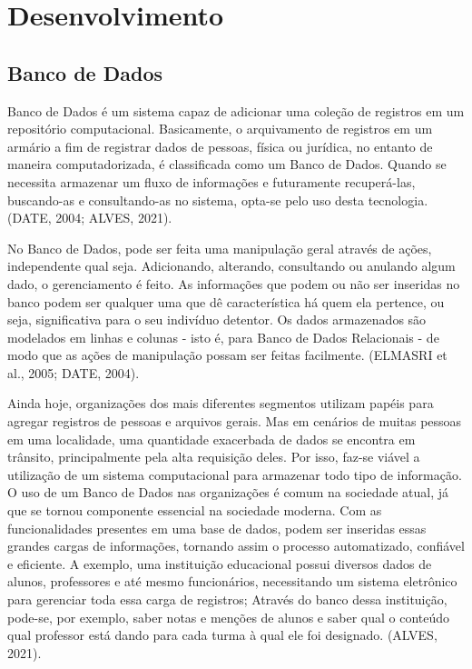 \documentclass[a4paper,12pt]{article}
\begin{document}
\pagebreak
\section{Desenvolvimento}
\subsection{Banco de Dados}
Banco de Dados é um sistema capaz de adicionar uma coleção de registros em um repositório computacional. Basicamente, o arquivamento de 
registros em um armário a fim de registrar dados de pessoas, física ou jurídica, no entanto de maneira computadorizada, é classificada 
como um Banco de Dados. Quando se necessita armazenar um fluxo de informações e futuramente recuperá-las, buscando-as e consultando-as 
no sistema, opta-se pelo uso desta tecnologia. (DATE, 2004; ALVES, 2021).

No Banco de Dados, pode ser feita uma manipulação geral através de ações, independente qual seja. Adicionando, alterando, consultando 
ou anulando algum dado, o gerenciamento é feito. As informações que podem ou não ser inseridas no banco podem ser qualquer uma que 
dê característica há quem ela pertence, ou seja, significativa para o seu indivíduo detentor. Os dados armazenados são modelados em 
linhas e colunas - isto é, para Banco de Dados Relacionais - de modo que as ações de manipulação possam ser feitas facilmente. (ELMASRI et al., 2005; DATE, 2004).

Ainda hoje, organizações dos mais diferentes segmentos utilizam papéis para agregar registros de pessoas e arquivos gerais. Mas em cenários
de muitas pessoas em uma localidade, uma quantidade exacerbada de dados se encontra em trânsito, principalmente pela alta requisição deles. 
Por isso, faz-se viável a utilização de um sistema computacional para armazenar todo tipo de informação. O uso de um Banco de Dados nas 
organizações é comum na sociedade atual, já que se tornou componente essencial na sociedade moderna. Com as funcionalidades presentes em 
uma base de dados, podem ser inseridas essas grandes cargas de informações, tornando assim o processo automatizado, confiável e eficiente. 
A exemplo, uma instituição educacional possui diversos dados de alunos, professores e até mesmo funcionários, necessitando um sistema 
eletrônico para gerenciar toda essa carga de registros; Através do banco dessa instituição, pode-se, por exemplo, saber notas e menções 
de alunos e saber qual o conteúdo qual professor está dando para cada turma à qual ele foi designado. (ALVES, 2021).
\end{document}
